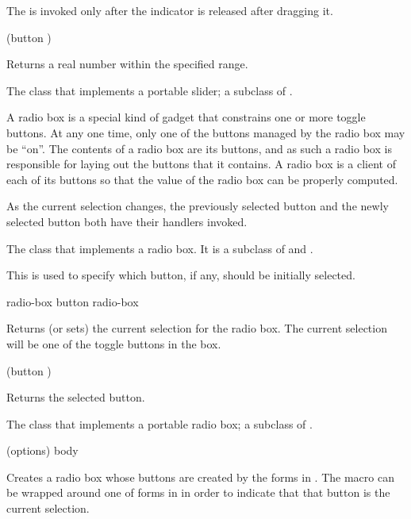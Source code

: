 The  is invoked only after the indicator is released
after dragging it.

 {(button )}

Returns a real number within the specified range.


The class that implements a portable slider; a subclass of .



A radio box is a special kind of gadget that constrains one or more toggle
buttons.  At any one time, only one of the buttons managed by the radio box may
be ``on''.  The contents of a radio box are its buttons, and as such a radio box
is responsible for laying out the buttons that it contains.  A radio box is a
client of each of its buttons so that the value of the radio box can be properly
computed.

As the current selection changes, the previously selected button and the newly
selected button both have their  handlers invoked.



The class that implements a radio box.  It is a subclass of 
and .


This is used to specify which button, if any, should be initially selected.

 {radio-box}
 {button radio-box}

Returns (or sets) the current selection for the radio box.  The current
selection will be one of the toggle buttons in the box.

 {(button )}

Returns the selected button.


The class that implements a portable radio box; a subclass of .

 {(\rest options) \body body}

Creates a radio box whose buttons are created by the forms in .  The
macro  can be wrapped around one of forms in
 in order to indicate that that button is the current selection.

